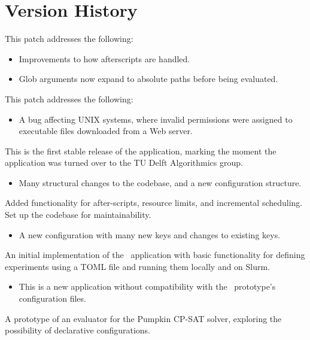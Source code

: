 \pagebreak

\section{Version History}




This patch addresses the following:
\begin{itemize}
\item Improvements to how afterscripts are handled.
\item Glob arguments now expand to absolute paths
      before being evaluated.
\end{itemize}


This patch addresses the following:
\begin{itemize}
\item A bug affecting UNIX systems, where invalid
      permissions were assigned to executable files
      downloaded from a Web server.
\end{itemize}


This is the first stable release of the application,
marking the moment the application was turned over
to the TU Delft Algorithmics group.

\breakingchanges
\begin{itemize}
\item Many structural changes to the codebase, and a
  new configuration structure.
\end{itemize}


Added functionality for after-scripts, resource limits,
and incremental scheduling.
Set up the codebase for maintainability.

\breakingchanges
\begin{itemize}
\item A new configuration with many new keys and
changes to existing keys.
\end{itemize}


An initial implementation of the \gourdtest\ application
with basic functionality for defining experiments using a
TOML file and running them locally and on Slurm.

\breakingchanges
\begin{itemize}
\item This is a new application without compatibility with
the \gourdtest\ prototype's configuration files.
\end{itemize}


A prototype of an evaluator for the Pumpkin CP-SAT solver,
exploring the possibility of declarative configurations.

\clearpage

